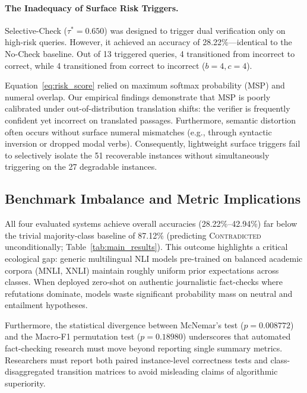 \paragraph{The Inadequacy of Surface Risk Triggers.}
Selective-Check ($\tau^*=0.650$) was designed to trigger dual verification only on high-risk queries. However, it achieved an accuracy of 28.22\%---identical to the No-Check baseline. Out of 13 triggered queries, 4 transitioned from incorrect to correct, while 4 transitioned from correct to incorrect ($b=4, c=4$). 

Equation~\ref{eq:risk_score} relied on maximum softmax probability (MSP) and numeral overlap. Our empirical findings demonstrate that MSP is poorly calibrated under out-of-distribution translation shifts: the verifier is frequently confident yet incorrect on translated passages. Furthermore, semantic distortion often occurs without surface numeral mismatches (e.g., through syntactic inversion or dropped modal verbs). Consequently, lightweight surface triggers fail to selectively isolate the 51 recoverable instances without simultaneously triggering on the 27 degradable instances.

\subsection{Benchmark Imbalance and Metric Implications}
All four evaluated systems achieve overall accuracies (28.22\%--42.94\%) far below the trivial majority-class baseline of 87.12\% (predicting \textsc{Contradicted} unconditionally; Table~\ref{tab:main_results}). This outcome highlights a critical ecological gap: generic multilingual NLI models pre-trained on balanced academic corpora (MNLI, XNLI) maintain roughly uniform prior expectations across classes. When deployed zero-shot on authentic journalistic fact-checks where refutations dominate, models waste significant probability mass on neutral and entailment hypotheses.

Furthermore, the statistical divergence between McNemar's test ($p = 0.008772$) and the Macro-F1 permutation test ($p = 0.18980$) underscores that automated fact-checking research must move beyond reporting single summary metrics. Researchers must report both paired instance-level correctness tests and class-disaggregated transition matrices to avoid misleading claims of algorithmic superiority.
